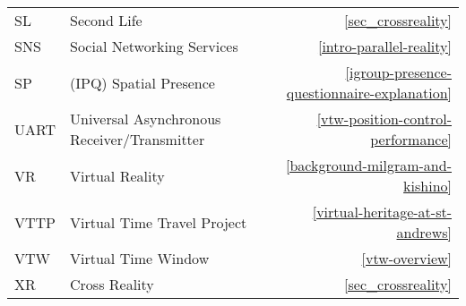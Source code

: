 \begin{center}
\begin{longtable}{l p{8cm} r}
SL & \centering Second Life & \ref{sec_crossreality} \\

SNS & \centering Social Networking Services & \ref{intro-parallel-reality} \\

SP & \centering (IPQ) Spatial Presence & \ref{igroup-presence-questionnaire-explanation} \\

UART & \centering Universal Asynchronous Receiver/Transmitter & \ref{vtw-position-control-performance} \\

VR & \centering Virtual Reality & \ref{background-milgram-and-kishino} \\

VTTP & \centering Virtual Time Travel Project & \ref{virtual-heritage-at-st-andrews} \\

VTW & \centering Virtual Time Window & \ref{vtw-overview} \\

XR & \centering Cross Reality & \ref{sec_crossreality} \\

\bottomrule

\end{longtable}
\end{center}